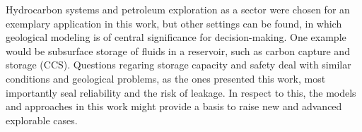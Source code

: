 	Hydrocarbon systems and petroleum exploration as a sector were chosen for an exemplary application in this work, but other settings can be found, in which geological modeling is of central significance for decision-making. One example would be subsurface storage of fluids in a reservoir, such as carbon capture and storage (CCS). Questions regaring storage capacity and safety deal with similar conditions and geological problems, as the ones presented this work, most importantly seal reliability and the risk of leakage. In respect to this, the models and approaches in this work might provide a basis to raise new and advanced explorable cases.